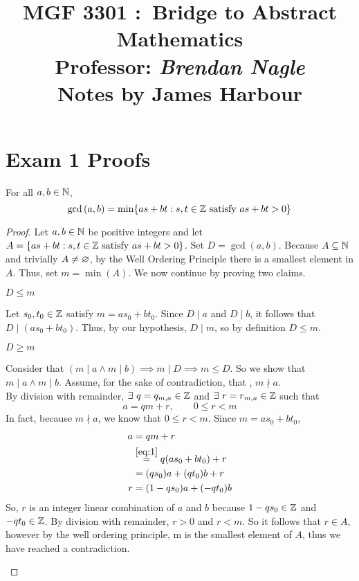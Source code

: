 \documentclass{scrartcl}
\title{
    \vspace{2in}
    \textmd{\textbf{MGF 3301 :\ Bridge to Abstract Mathematics}}\\
    \vspace{0.1in}\large{Professor: \textit{Brendan Nagle}}\\
    \vspace{3in}
    Notes by James Harbour
}
\begin{document}
\maketitle
\newpage

\section{Exam 1 Proofs}

\begin{theorem}
  For all $a, b\in \mathbb{N}$,
  \[
    \gcd{(a,b)} = \min\{as+bt : s,t\in\Z\ \mathrm{satisfy}\ as+bt>0\}
  \]
\end{theorem}

\begin{proof}
  Let $a,b \in \mathbb{N}$ be positive integers and let $A = \{as+bt : s,t\in\mathbb{Z}\ \mathrm{satisfy}\ as+bt>0\}$. Set $D = \gcd{(a,b)}$. Because $A \subseteq \mathbb{N}$ and trivially $A \neq \varnothing$, by the Well Ordering Principle there is a smallest element in $A$. Thus, set $m = \min{(A)}$. We now continue by proving two claims.

  \begin{claim}
    $D \leq m$
  \end{claim}

  \begin{subproof}
    Let $s_0, t_0 \in \mathbb{Z}$ satisfy $m = as_0 + bt_0$. Since $D \mid a$ and $D \mid b$, it follows that $D \mid (as_0 + bt_0)$. Thus, by our hypothesis, $D \mid m$, so by definition $D \leq m$.
  \end{subproof}

  \begin{claim}
    $D \geq m$
  \end{claim}

  \begin{subproof}
    Consider that $(m\mid a \land m\mid b) \implies m\mid D \implies m \leq D$. So we show that $m\mid a \land m\mid b$. Assume, for the sake of contradiction, that \WLOG, $m \nmid a$.\\
    By division with remainder, $\exists\ q=q_{m,a} \in \Z$ and $\exists\ r=r_{m,a} \in \Z$ such that
    \begin{equation}\label{eq:1}
      a = qm + r,\qquad 0 \leq r < m
    \end{equation}
    In fact, because $m\nmid a$, we know that $0 \leq r < m$. Since $m=as_0 + bt_0$,
    \begin{align*}
      a &= qm + r \\
      &\overset{\eqref{eq:1}}{=} q(as_0 + bt_0) + r \\
      &=(qs_0)a + (qt_0)b + r \\
      r &= (1 - qs_0)a + (-qt_0)b
    \end{align*}
    So, $r$ is an integer linear combination of $a$ and $b$ because $1 - qs_0 \in \mathbb{Z}$ and $-qt_0 \in \mathbb{Z}$. By division with remainder, $r > 0$ and $r < m$. So it follows that $r \in A$, however by the well ordering principle, m is the smallest element of $A$, thus we have reached a contradiction.
  \end{subproof}
\end{proof}
\end{document}
